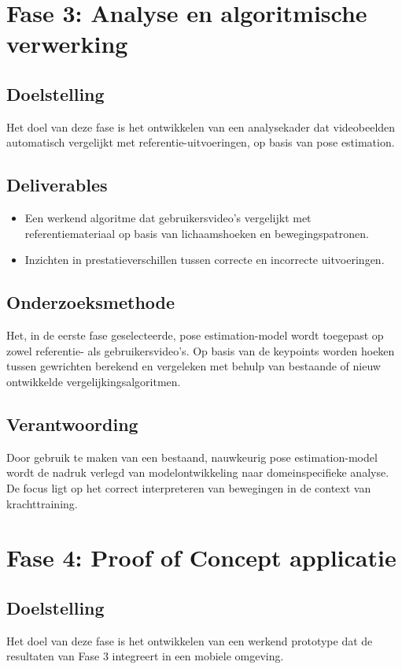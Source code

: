 \section{Fase 3: Analyse en algoritmische verwerking}
\subsection{Doelstelling}
Het doel van deze fase is het ontwikkelen van een analysekader dat videobeelden automatisch vergelijkt met referentie-uitvoeringen, op basis van pose estimation.

\subsection{Deliverables}
\begin{itemize}
    \item Een werkend algoritme dat gebruikersvideo’s vergelijkt met referentiemateriaal op basis van lichaamshoeken en bewegingspatronen.
    \item Inzichten in prestatieverschillen tussen correcte en incorrecte uitvoeringen.
\end{itemize}

\subsection{Onderzoeksmethode}
Het, in de eerste fase geselecteerde, pose estimation-model wordt toegepast op zowel referentie- als gebruikersvideo’s. 
Op basis van de keypoints worden hoeken tussen gewrichten berekend en vergeleken met behulp van bestaande of nieuw ontwikkelde vergelijkingsalgoritmen.

\subsection{Verantwoording}
Door gebruik te maken van een bestaand, nauwkeurig pose estimation-model wordt de nadruk verlegd van modelontwikkeling naar domeinspecifieke analyse. 
De focus ligt op het correct interpreteren van bewegingen in de context van krachttraining.  

\section{Fase 4: Proof of Concept applicatie}
\subsection{Doelstelling}
Het doel van deze fase is het ontwikkelen van een werkend prototype dat de resultaten van Fase 3 integreert in een mobiele omgeving.

